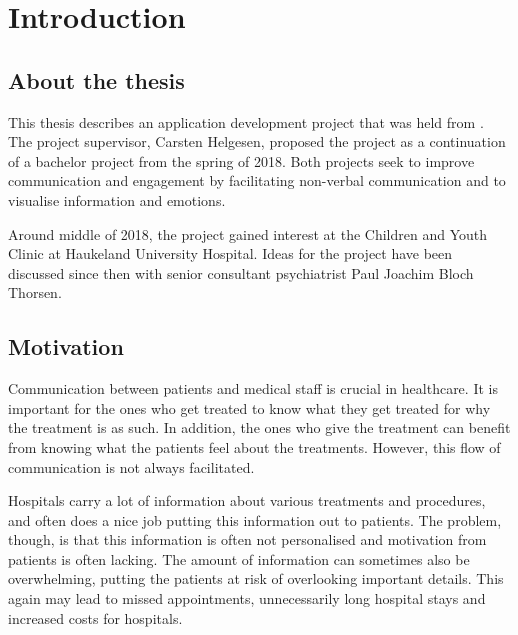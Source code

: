 \chapter{Introduction}
\label{ch:introduction}

\section{About the thesis}
\label{sec:about}

This thesis describes an application development project that was held from {\printdayoff {}}. The project supervisor, Carsten Helgesen, proposed the project as a continuation of a bachelor project from the spring of 2018. Both projects seek to improve communication and engagement by facilitating non-verbal communication and to visualise information and emotions.

Around middle of 2018, the project gained interest at the Children and Youth Clinic at Haukeland University Hospital. Ideas for the project have been discussed since then with senior consultant psychiatrist Paul Joachim Bloch Thorsen.

\section{Motivation}
\label{sec:motivation}

Communication between patients and medical staff is crucial in healthcare. It is important for the ones who get treated to know what they get treated for why the treatment is as such. In addition, the ones who give the treatment can benefit from knowing what the patients feel about the treatments. However, this flow of communication is not always facilitated.



Hospitals carry a lot of information about various treatments and procedures, and often does a nice job putting this information out to patients. The problem, though, is that this information is often not personalised and motivation from patients is often lacking. The amount of information can sometimes also be overwhelming, putting the patients at risk of overlooking important details. This again may lead to missed appointments, unnecessarily long hospital stays and increased costs for hospitals.


